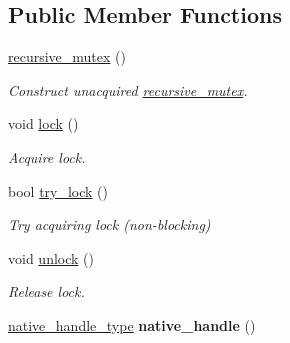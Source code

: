 \subsection*{Public Member Functions}
\begin{DoxyCompactItemize}
\item 
\hypertarget{classtbb_1_1recursive__mutex_a47eb6e7e7ffa5d35341125792b17236b}{}\hyperlink{classtbb_1_1recursive__mutex_a47eb6e7e7ffa5d35341125792b17236b}{recursive\+\_\+mutex} ()\label{classtbb_1_1recursive__mutex_a47eb6e7e7ffa5d35341125792b17236b}

\begin{DoxyCompactList}\small\item\em Construct unacquired \hyperlink{classtbb_1_1recursive__mutex}{recursive\+\_\+mutex}. \end{DoxyCompactList}\item 
\hypertarget{classtbb_1_1recursive__mutex_adea997b45dc4a360f38d14bde9c991f2}{}void \hyperlink{classtbb_1_1recursive__mutex_adea997b45dc4a360f38d14bde9c991f2}{lock} ()\label{classtbb_1_1recursive__mutex_adea997b45dc4a360f38d14bde9c991f2}

\begin{DoxyCompactList}\small\item\em Acquire lock. \end{DoxyCompactList}\item 
bool \hyperlink{classtbb_1_1recursive__mutex_a8b181d9aaa95444145222cfe206e8094}{try\+\_\+lock} ()
\begin{DoxyCompactList}\small\item\em Try acquiring lock (non-\/blocking) \end{DoxyCompactList}\item 
\hypertarget{classtbb_1_1recursive__mutex_af57e8d25e0e7614e98bcfa50bc9416c8}{}void \hyperlink{classtbb_1_1recursive__mutex_af57e8d25e0e7614e98bcfa50bc9416c8}{unlock} ()\label{classtbb_1_1recursive__mutex_af57e8d25e0e7614e98bcfa50bc9416c8}

\begin{DoxyCompactList}\small\item\em Release lock. \end{DoxyCompactList}\item 
\hypertarget{classtbb_1_1recursive__mutex_a050ca2a8d3b5c98f9d6c1252856436db}{}\hyperlink{classtbb_1_1recursive__mutex_a59f90e65656fec5a07e375c6e7cd39f3}{native\+\_\+handle\+\_\+type} {\bfseries native\+\_\+handle} ()\label{classtbb_1_1recursive__mutex_a050ca2a8d3b5c98f9d6c1252856436db}

\end{DoxyCompactItemize}
